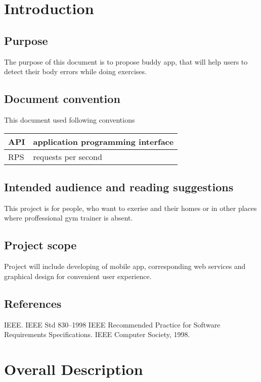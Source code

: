 \documentclass{article}
\begin{document}
\begin{titlepage}

\end{titlepage}

\section{Introduction}
\subsection{Purpose}
The purpose of this document is to propose buddy app, that will help users to detect their body errors while doing exercises.

\subsection{Document convention}
This document used following conventions
\begin{table}[h!]
	\begin{tabular}{|l|l|}
	\hline
	API & application programming interface  \\ \hline
	RPS & requests per second \\ \hline

	\end{tabular}
	\end{table}

\subsection{Intended audience and reading suggestions}
This project is for people, who want to exerise and their homes or in other places where proffessional gym trainer is absent.

\subsection{Project scope}
Project will include developing of mobile app, corresponding web services and graphical design for convenient user experience.

\subsection{References}
IEEE. IEEE Std 830–1998 IEEE Recommended Practice for Software Requirements Specifications. IEEE Computer Society, 1998.

\section{Overall Description}
\end{document}
